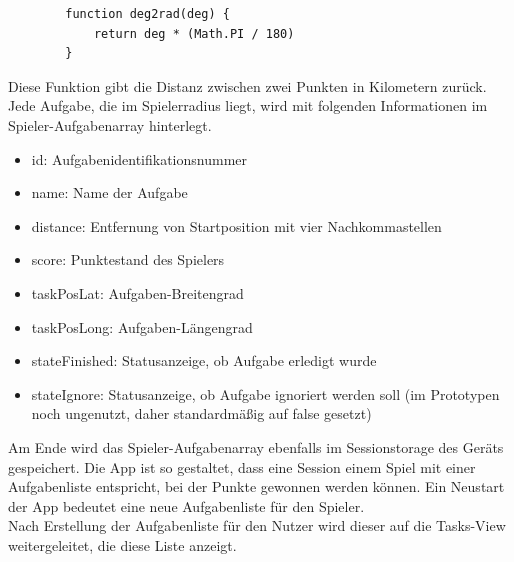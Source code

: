\begin{lstlisting}
        function deg2rad(deg) {
            return deg * (Math.PI / 180)
        }
\end{lstlisting}
\cite{deg2rad}

Diese Funktion gibt die Distanz zwischen zwei Punkten in Kilometern zurück.
\\
Jede Aufgabe, die im Spielerradius liegt, wird mit folgenden Informationen im Spieler-Aufgabenarray hinterlegt.
\begin{itemize}
\item id: Aufgabenidentifikationsnummer
\item name: Name der Aufgabe
\item distance: Entfernung von Startposition mit vier Nachkommastellen
\item score: Punktestand des Spielers
\item taskPosLat: Aufgaben-Breitengrad
\item taskPosLong: Aufgaben-Längengrad
\item stateFinished: Statusanzeige, ob Aufgabe erledigt wurde
\item stateIgnore: Statusanzeige, ob Aufgabe ignoriert werden soll (im Prototypen noch ungenutzt, daher standardmäßig auf false gesetzt)
\end{itemize}
Am Ende wird das Spieler-Aufgabenarray ebenfalls im Sessionstorage des Geräts gespeichert. Die App ist so gestaltet, dass eine Session einem Spiel mit einer Aufgabenliste entspricht, bei der Punkte gewonnen werden können. Ein Neustart der App bedeutet eine neue Aufgabenliste für den Spieler.
\\
Nach Erstellung der Aufgabenliste für den Nutzer wird dieser auf die Tasks-View weitergeleitet, die diese Liste anzeigt.
